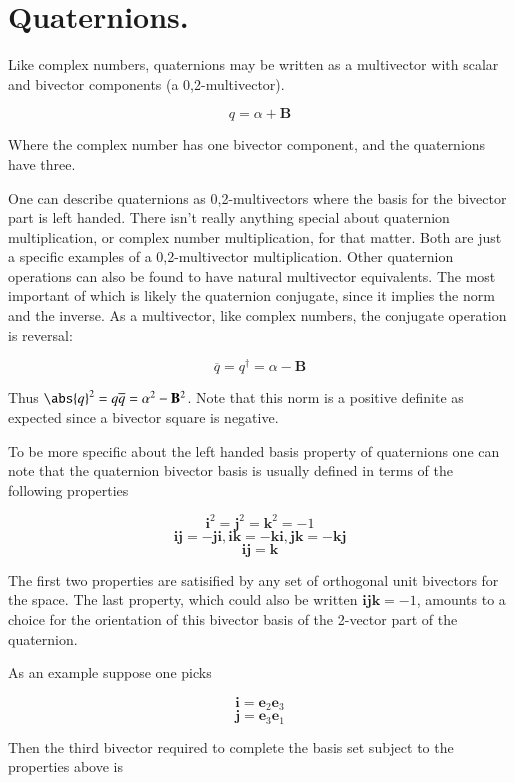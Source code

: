\chapter{Quaternions.} %

Like complex numbers, quaternions may be written as a multivector with scalar and bivector components (a 0,2-multivector).

\[
q = \alpha + \mathbf{B}
\]

Where the complex number has one bivector component, and the quaternions have three.

One can describe quaternions as 0,2-multivectors where the basis for the bivector part is left handed.  There isn't really anything special about quaternion multiplication, or complex number multiplication, for that matter.  Both are just a specific examples of a 0,2-multivector multiplication.  Other quaternion operations can also be found to have natural multivector equivalents.  The most important of which is likely the quaternion conjugate, since it implies the norm and the inverse.  As a multivector, like complex numbers, the conjugate operation is reversal:

\[
\overline{q} = q^\dagger = \alpha - \mathbf{B}
\]

Thus $\abs{q}^2 = q\overline{q} = \alpha^2 - \mathbf{B}^2$.  Note that this norm is a positive definite as expected since a bivector square is negative.

To be more specific about the left handed basis property of quaternions one can note that the quaternion bivector basis is usually defined in terms of the following properties

\[
\mathbf{i}^2 = \mathbf{j}^2 = \mathbf{k}^2 = -1
\]
\[
\mathbf{i}\mathbf{j} = -\mathbf{j}\mathbf{i}, \mathbf{i}\mathbf{k} = -\mathbf{k}\mathbf{i}, \mathbf{j}\mathbf{k} = -\mathbf{k}\mathbf{j}
\]
\[
\mathbf{i}\mathbf{j} = \mathbf{k}
\]

The first two properties are satisified by any set of orthogonal unit bivectors for the space.  The last property, which could also be written $\mathbf{i}\mathbf{j}\mathbf{k} = -1$, amounts to a choice for the orientation of this bivector basis of the 2-vector part of the quaternion.

As an example suppose one picks

\[
\mathbf{i} = \mathbf{e}_2\mathbf{e}_3
\]
\[
\mathbf{j} = \mathbf{e}_3\mathbf{e}_1
\]

Then the third bivector required to complete the basis set subject to the properties above is

